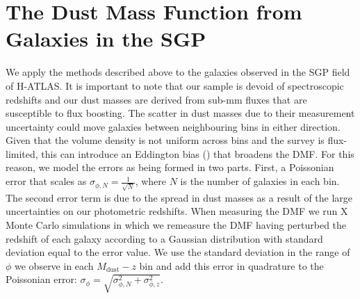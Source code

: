 \section{The Dust Mass Function from Galaxies in the SGP}

We apply the methods described above to the galaxies observed in the SGP field of H-ATLAS. It is important to note that our sample is devoid of spectroscopic redshifts and our dust masses are derived from sub-mm fluxes that are susceptible to flux boosting. The scatter in dust masses due to their measurement uncertainty could move galaxies between neighbouring bins in either direction. Given that the volume density is not uniform across bins and the survey is flux-limited, this can introduce an Eddington bias (\citealt{Eddington_1913}) that broadens the DMF. For this reason, we model the errors as being formed in two parts. First, a Poissonian error that scales as $\sigma_{\phi,N} = \frac{1}{\sqrt{N}}$, where $N$ is the number of galaxies in each bin. The second error term is due to the spread in dust masses as a result of the large uncertainties on our photometric redshifts. When measuring the DMF we run {\color{red} X} Monte Carlo simulations in which we remeasure the DMF having perturbed the redshift of each galaxy according to a Gaussian distribution with standard deviation equal to the error value. We use the standard deviation in the range of $\phi$ we observe in each $M_{\textrm{dust}} - z$ bin and add this error in quadrature to the Poissonian error: $\sigma_\phi = \sqrt{\sigma_{\phi,N}^2 + \sigma_{\phi,z}^2}$.



